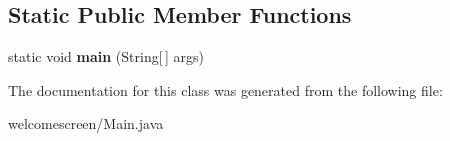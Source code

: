 \subsection*{Static Public Member Functions}
\begin{DoxyCompactItemize}
\item 
static void {\bfseries main} (String\mbox{[}$\,$\mbox{]} args)\hypertarget{classwelcomescreen_1_1_main_a80b1b2f76609f409b059c2da5b649cbb}{}\label{classwelcomescreen_1_1_main_a80b1b2f76609f409b059c2da5b649cbb}

\end{DoxyCompactItemize}


The documentation for this class was generated from the following file\+:\begin{DoxyCompactItemize}
\item 
welcomescreen/Main.\+java\end{DoxyCompactItemize}

